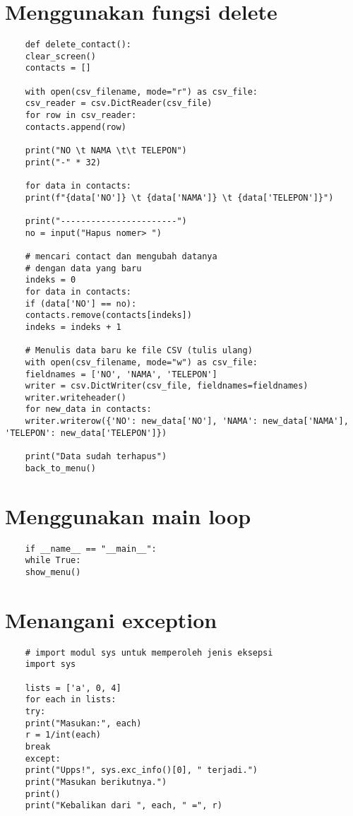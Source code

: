 \documentclass{article}
\begin{document}
\section{Menggunakan fungsi delete}
\begin{lstlisting}
	def delete_contact():
	clear_screen()
	contacts = []
	
	with open(csv_filename, mode="r") as csv_file:
	csv_reader = csv.DictReader(csv_file)
	for row in csv_reader:
	contacts.append(row)
	
	print("NO \t NAMA \t\t TELEPON")
	print("-" * 32)
	
	for data in contacts:
	print(f"{data['NO']} \t {data['NAMA']} \t {data['TELEPON']}")
	
	print("-----------------------")
	no = input("Hapus nomer> ")
	
	# mencari contact dan mengubah datanya
	# dengan data yang baru
	indeks = 0
	for data in contacts:
	if (data['NO'] == no):
	contacts.remove(contacts[indeks])
	indeks = indeks + 1
	
	# Menulis data baru ke file CSV (tulis ulang)
	with open(csv_filename, mode="w") as csv_file:
	fieldnames = ['NO', 'NAMA', 'TELEPON']
	writer = csv.DictWriter(csv_file, fieldnames=fieldnames)
	writer.writeheader()
	for new_data in contacts:
	writer.writerow({'NO': new_data['NO'], 'NAMA': new_data['NAMA'], 'TELEPON': new_data['TELEPON']}) 
	
	print("Data sudah terhapus")
	back_to_menu()
\end{lstlisting}

\section{Menggunakan main loop}
\begin{lstlisting}
	if __name__ == "__main__":
	while True:
	show_menu()
\end{lstlisting}

\section{Menangani exception}
\begin{lstlisting}
	# import modul sys untuk memperoleh jenis eksepsi
	import sys
	
	lists = ['a', 0, 4]
	for each in lists:
	try:
	print("Masukan:", each)
	r = 1/int(each)
	break
	except:
	print("Upps!", sys.exc_info()[0], " terjadi.")
	print("Masukan berikutnya.")
	print()
	print("Kebalikan dari ", each, " =", r)
\end{lstlisting}
\end{document}
